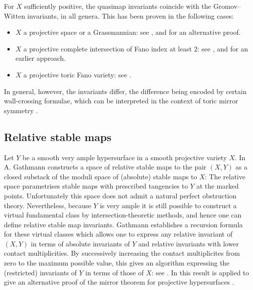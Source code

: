 \documentclass[10pt]{amsart}
\newcommand{\M}[4]{\overline{\mathcal{M}}_{#1,#2}(#3,#4)}
\theoremstyle{definition}
\theoremstyle{definition}
\begin{document}
For $X$ sufficiently positive, the quasimap invariants coincide with the Gromov--Witten invariants, in all genera. This has been proven in the following cases:
\begin{itemize}[leftmargin=0.7cm]
\item $X$ a projective space or a Grassmannian: see \cite[Theorems~ 3~and~4]{MOP}, and \cite{ManolacheStable} for an alternative proof.
\item $X$ a projective complete intersection of Fano index at least $2$: see \cite[Corollary 1.7]{CF-K-MirrorSymmetry}, and \cite{CZ-mirror} for an earlier approach.
\item $X$ a projective toric Fano variety: see \cite[Corollary 1.3]{CF-K-higher-genus}.
\end{itemize}
In general, however, the invariants differ, the difference being encoded by certain wall-crossing formulae, which can be interpreted in the context of toric mirror symmetry \cite{CF-K-wallcrossing}.

\subsection{Relative stable maps}\label{subsection relative maps}
Let $Y$ be a smooth very ample hypersurface in a smooth projective variety $X$. In \cite{Ga} A. Gathmann constructs a space of relative stable maps to the pair $(X,Y)$ as a closed substack of the moduli space of (absolute) stable maps to $X$:
The relative space parametrises stable maps with prescribed tangencies to $Y$ at the marked points.  Unfortunately this space does not admit a natural perfect obstruction theory. Nevertheless, because $Y$ is very ample it is still possible to construct a virtual fundamental class by intersection-theoretic methods, and hence one can define relative stable map invariants.
Gathmann establishes a recursion formula for these virtual classes which allows one to express any relative invariant of $(X,Y)$ in terms of absolute invariants of $Y$ and relative invariants with lower contact multiplicities. By successively increasing the contact multiplicites from zero to the maximum possible value, this gives an algorithm expressing the (restricted) invariants of $Y$ in terms of those of $X$: see \cite[Corollary 5.7]{Ga}. In \cite{Ga-MF} this result is applied to give an alternative proof of the mirror theorem for projective hypersurfaces \cite{Givental-equivariantGW} \cite{LLY1}.
\end{document}
